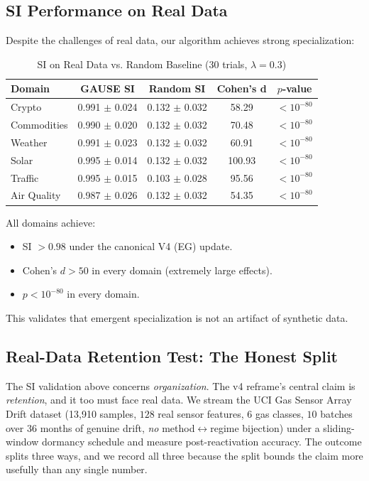 \documentclass[11pt,a4paper]{article}
\theoremstyle{definition}
\theoremstyle{plain}
\begin{document}
\subsection{SI Performance on Real Data}

Despite the challenges of real data, our algorithm achieves strong specialization:

\begin{table}[h]
\centering
\caption{SI on Real Data vs. Random Baseline (30 trials, $\lambda = 0.3$)}
\begin{tabular}{l|cc|c|c}
\toprule
Domain & GAUSE SI & Random SI & Cohen's d & $p$-value \\
\midrule
Crypto & 0.991 $\pm$ 0.024 & 0.132 $\pm$ 0.032 & 58.29 & $< 10^{-80}$ \\
Commodities & 0.990 $\pm$ 0.020 & 0.132 $\pm$ 0.032 & 70.48 & $< 10^{-80}$ \\
Weather & 0.991 $\pm$ 0.023 & 0.132 $\pm$ 0.032 & 60.91 & $< 10^{-80}$ \\
Solar & 0.995 $\pm$ 0.014 & 0.132 $\pm$ 0.032 & 100.93 & $< 10^{-80}$ \\
Traffic & 0.995 $\pm$ 0.015 & 0.103 $\pm$ 0.028 & 95.56 & $< 10^{-80}$ \\
Air Quality & 0.987 $\pm$ 0.026 & 0.132 $\pm$ 0.032 & 54.35 & $< 10^{-80}$ \\
\bottomrule
\end{tabular}
\end{table}

\begin{keypoint}
All domains achieve:
\begin{itemize}
    \item SI $> 0.98$ under the canonical V4 (EG) update.
    \item Cohen's $d > 50$ in every domain (extremely large effects).
    \item $p < 10^{-80}$ in every domain.
\end{itemize}
This validates that emergent specialization is not an artifact of synthetic data.
\end{keypoint}

\subsection{Real-Data Retention Test: The Honest Split}
\label{ddsec:realdata}

The SI validation above concerns \emph{organization}. The v4 reframe's central claim
is \emph{retention}, and it too must face real data. We stream the UCI Gas Sensor
Array Drift dataset (13{,}910 samples, $128$ real sensor features, $6$ gas classes,
$10$ batches over $36$ months of genuine drift, \emph{no} method$\leftrightarrow$regime
bijection) under a sliding-window dormancy schedule and measure post-reactivation
accuracy. The outcome splits three ways, and we record all three because the split
bounds the claim more usefully than any single number.
\end{document}
